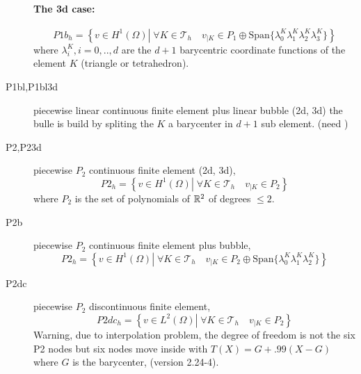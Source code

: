 \documentclass[a4paper,twoside,12pt]{book}
\begin{document}
\begin{description}
     \paragraph{The 3d case:}
      \begin{equation}
     P1b_{h} = \left\{ v \in H^{1}(\Omega) \left|\; \forall K \in \mathcal{T}_{h}
        \quad v_{|K} \in P_{1} \oplus \mathrm{Span}\{  \lambda^{K}_{0} \lambda^{K}_{1} \lambda^{K}_{2} \lambda^{K}_{3} \} \right.\right\} \label{eq:P1b-3d}
     \end{equation}
    where $\lambda ^{K}_{i}, i=0,..,d$ are the $d+1$ barycentric  coordinate functions of the element  $K$ (triangle or tetrahedron).
    \item[P1bl,P1bl3d]  piecewise linear  continuous finite element plus linear bubble (2d, 3d) \label{warP1dc}
     the bulle is build by spliting the $K$ a barycenter in $d+1$ sub element. (need )
     
     \item[P2,P23d] piecewise $P_{2}$  continuous finite element (2d, 3d),
     \begin{equation}
     P2_{h} = \left\{ v \in H^{1}(\Omega) \left|\; \forall K \in \mathcal{T}_{h}
        \quad v_{|K} \in P_{2} \right.\right\}
     \end{equation}
     where
     $P_{2}$ is the set of polynomials of $\mathbb{R}^{2}$ of  degrees $\le 2$.
    
     \item[P2b] piecewise $P_{2} $ continuous finite element  plus bubble,
     \begin{equation}
     P2_{h} = \left\{ v \in H^{1}(\Omega) \left|\; \forall K \in \mathcal{T}_{h}
        \quad v_{|K} \in P_{2} \oplus \mathrm{Span}\{  \lambda^{K}_{0} \lambda^{K}_{1} \lambda^{K}_{2} \} \right.\right\}
     \end{equation}

     \item[P2dc] piecewise $P_{2}$  discontinuous finite element,
     \begin{equation}
     P2dc_{h} = \left\{ v \in L^{2}(\Omega) \left|\; \forall K \in \mathcal{T}_{h}
        \quad v_{|K} \in P_{2} \right.\right\}
     \end{equation}
    Warning, due to interpolation problem, the degree of freedom is not the six  P2 nodes  but six  nodes  move
     inside with $T(X)= G + .99  (X-G) $ where $G$ is the barycenter, (version 2.24-4).


\end{description}
\end{document}
